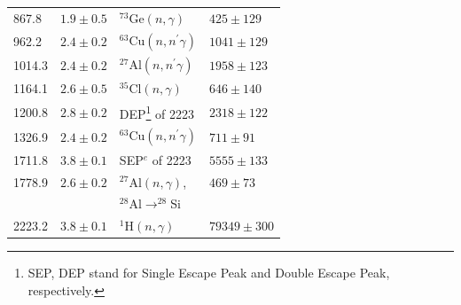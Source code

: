 \begin{table}[tbhp]
\begin{minipage}{\linewidth}
\begin{tabular*}{\textwidth}{llll}
867.8  & $1.9 \pm 0.5$ & $^{73}$Ge$(n,\gamma)$        & $425  \pm 129$ \\
962.2  & $2.4 \pm 0.2$ & $^{63}$Cu$(n,n^\prime\gamma)$ & $1041 \pm 129$ \\
1014.3 & $2.4 \pm 0.2$ & $^{27}$Al$(n,n^\prime\gamma)$ & $1958 \pm 123$ \\
1164.1 & $2.6 \pm 0.5$ & $^{35}$Cl$(n,\gamma)$        & $646  \pm 140$ \\
1200.8 & $2.8 \pm 0.2$ & DEP\footnote{SEP, DEP stand for Single Escape Peak and Double Escape Peak, respectively.} of 2223 & $2318 \pm 122$ \\
1326.9 & $2.4 \pm 0.2$ & $^{63}$Cu$(n,n^\prime\gamma)$   & $711 \pm 91$  \\
1711.8 & $3.8 \pm 0.1$ & SEP$^e$ of 2223 & $5555 \pm 133$ \\
1778.9 & $2.6 \pm 0.2$ & $^{27}$Al$(n,\gamma)$, & $469  \pm 73$ \\
&  & $^{28}$Al$\rightarrow^{28}$Si &  \\
2223.2 & $3.8 \pm 0.1$ & $^{1}$H$(n,\gamma)$    & $79349 \pm 300$ \\
\end{tabular*}
\end{minipage}
\end{table}

